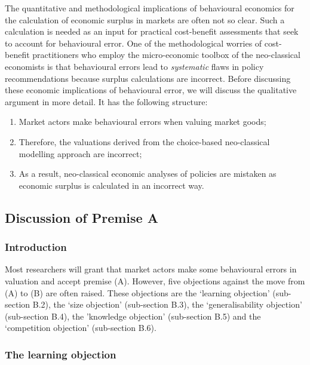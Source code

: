 \documentclass[
]{book}
\providecommand{\tightlist}{%
  \setlength{\itemsep}{0pt}\setlength{\parskip}{0pt}}
\begin{document}
The quantitative and methodological implications of behavioural economics for the calculation of economic surplus in markets are often not so clear. Such a calculation is needed as an input for practical cost-benefit assessments that seek to account for behavioural error. One of the methodological worries of cost-benefit practitioners who employ the micro-economic toolbox of the neo-classical economists is that behavioural errors lead to \emph{systematic} flaws in policy recommendations because surplus calculations are incorrect. Before discussing these economic implications of behavioural error, we will discuss the qualitative argument in more detail. It has the following structure:

\begin{enumerate}
\def\labelenumi{(\Alph{enumi})}
\tightlist
\item
  Market actors make behavioural errors when valuing market goods;
\item
  Therefore, the valuations derived from the choice-based neo-classical modelling approach are incorrect;
\item
  As a result, neo-classical economic analyses of policies are mistaken as economic surplus is calculated in an incorrect way.
\end{enumerate}

\hypertarget{discussion-of-premise-a}{%
\subsection{Discussion of Premise A}\label{discussion-of-premise-a}}

\hypertarget{introduction-6}{%
\subsubsection{Introduction}\label{introduction-6}}

Most researchers will grant that market actors make some behavioural errors in valuation and accept premise (A). However, five objections against the move from (A) to (B) are often raised. These objections are the `learning objection' (sub-section B.2), the `size objection' (sub-section B.3), the `generalisability objection' (sub-section B.4), the 'knowledge objection' (sub-section B.5) and the `competition objection' (sub-section B.6).

\hypertarget{the-learning-objection}{%
\subsubsection{The learning objection}\label{the-learning-objection}}
\end{document}
